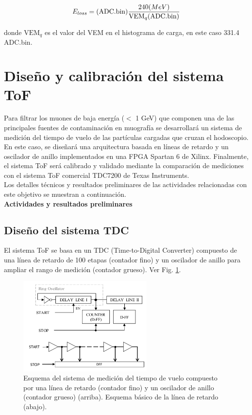 \begin{equation}
    E_{loss} =  (\text{ADC.bin})\frac{240 \text(MeV)}{ \text{VEM}_q(\text{ADC.bin})}
\end{equation}

donde $\text{VEM}_q$ es el valor del VEM en el histograma de carga, en este caso 331.4 ADC.bin.

\section{Diseño y calibración del sistema ToF}

Para filtrar los muones de baja energía ($<$ 1 GeV) \cite{Bozza2017} que componen una de las principales fuentes de contaminación en muografía se desarrollará un sistema de medición del tiempo de vuelo de las partículas cargadas que cruzan el hodoscopio. En este caso, se diseñará una arquitectura basada en líneas de retardo y un oscilador de anillo implementados en una FPGA Spartan 6 de Xilinx. Finalmente, el sistema ToF será calibrado y validado mediante la comparación de mediciones con el sistema ToF comercial TDC7200 de Texas Instruments.\\

Los detalles técnicos y resultados preliminares de las actividades relacionadas con este objetivo se muestran a continuación.\\

\textbf{Actividades y resultados preliminares}\\

\subsection{Diseño del sistema  TDC}

El sistema ToF se basa en un TDC (Time-to-Digital Converter) compuesto de una línea de retardo de 100 etapas (contador fino) y un oscilador de anillo para ampliar el rango de medición (contador grueso). Ver Fig. \ref{Arch}.\\

\begin{figure}[h!]
\begin{center}
\includegraphics[width=0.6\textwidth]{Figures/Architecture}
\caption{Esquema del sistema de medición del tiempo de vuelo compuesto por una línea de retardo (contador fino) y un oscilador de anillo (contador grueso) (arriba). Esquema básico de la línea de retardo (abajo).}
\label{Arch}
\end{center}
\end{figure}

